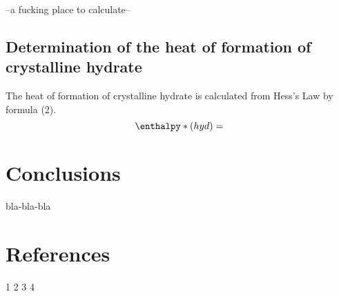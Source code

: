 \documentclass[12pt, letterpaper]{article}
\begin{document}
         --a fucking place to calculate--

         \subsection{Determination of the heat of formation of crystalline hydrate}
         The heat of formation of crystalline hydrate is calculated from Hess's Law by formula (2).
         \begin{equation}
            \enthalpy*(hyd){} = 
        \end{equation}

    \section{Conclusions}
        bla-bla-bla















    
    \newpage
    \section{References}
        1
        2
        3
        4
\end{document}
